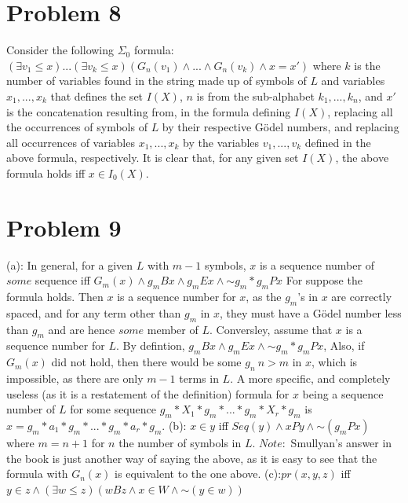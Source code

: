 \documentclass{article}
\newcommand*{\oldneg}{\mathord{\sim}}
\theoremstyle{definition}
\begin{document}
\section*{Problem 8}
Consider the following $\Sigma_0$ formula:\newline
$(\exists v_1\le x)...(\exists v_k\le x)(G_n(v_1)\wedge ...\wedge G_n(v_k)\wedge x=x')$\newline
where $k$ is the number of variables found in the string made up of symbols of $L$ and variables $x_1,...,x_k$ that defines the set $I(X)$, $n$ is from 
the sub-alphabet $k_1,...,k_n$, and $x'$ is the concatenation resulting from, in the formula defining $I(X)$,
 replacing all the occurrences of symbols of $L$ by their respective Gödel numbers, and replacing all occurrences of variables $x_1,...,x_k$ by the 
variables $v_1,...,v_k$ defined in the above formula, respectively.
It is clear that, for any given set $I(X)$, the above formula holds iff $x\in I_0(X)$.   
\section*{Problem 9}
(a):\newline
In general, for a given $L$ with $m-1$ symbols, $x$ is a sequence number of $some$ sequence iff $G_m(x)\wedge g_mBx\wedge g_mEx\wedge \oldneg g_m*g_mPx$
\newline For suppose the formula holds. Then $x$ is a sequence number for $x$, as the $g_m$'s in $x$ are correctly spaced, and for any term other than 
$g_m$ in $x$, they must have a Gödel number less than $g_m$ and are hence $some$ member of $L$. 
 Conversley, assume that $x$ is a sequence number for 
$L$. By defintion, $g_mBx\wedge g_mEx\wedge \oldneg g_m*g_mPx$,
 Also, if $G_m(x)$ did not hold, then there would be some $g_n\ n>m$ in $x$, which is impossible, as there are only $m-1$ terms in $L$. A more specific, 
and completely useless (as it is a restatement of the definition) formula for $x$ being a sequence number of $L$ for some sequence $g_m*X_1*g_m*...*g_m*X_r*
g_m$ is $x=g_m*a_1*g_m*...*g_m*a_r*g_m$.
\newline (b):\newline
$x\in y$ iff $Seq(y)\wedge xPy\wedge \oldneg (g_mPx)$ where $m=n+1$ for $n$ the number of symbols in $L$. $Note:$ Smullyan's answer in the book 
is just another way of saying the above, as it is easy to see that the formula with $G_n(x)$ is equivalent to the one above.\newline
(c):\newline $pr(x,y,z)$ iff $y\in z\wedge (\exists w\le z)(wBz\wedge x\in W\wedge\oldneg (y\in w))$
\end{document}
